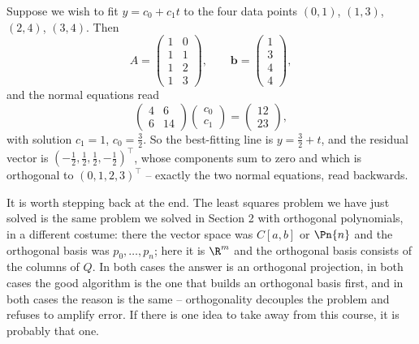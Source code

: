 \begin{example}
  Suppose we wish to fit $y = c_0 + c_1t$ to the four data points $(0,1)$, $(1,3)$, $(2,4)$, $(3,4)$. Then
  $$
  A = \begin{pmatrix}1&0\\1&1\\1&2\\1&3\end{pmatrix}, \qquad \mathbf b = \begin{pmatrix}1\\3\\4\\4\end{pmatrix},
  $$
  and the normal equations read
  $$
  \begin{pmatrix}4&6\\6&14\end{pmatrix}\begin{pmatrix}c_0\\c_1\end{pmatrix} = \begin{pmatrix}12\\23\end{pmatrix},
  $$
  with solution $c_1 = 1$, $c_0 = \tfrac32$. So the best-fitting line is $y = \tfrac32 + t$, and the residual vector is $\left(-\tfrac12, \tfrac12, \tfrac12, -\tfrac12\right)^\top$, whose components sum to zero and which is orthogonal to $(0,1,2,3)^\top$ -- exactly the two normal equations, read backwards.
\end{example}

\begin{remark}
  It is worth stepping back at the end. The least squares problem we have just solved is the same problem we solved in Section 2 with orthogonal polynomials, in a different costume: there the vector space was $C[a,b]$ or $\Pn{n}$ and the orthogonal basis was $p_0, \dots, p_n$; here it is $\R^m$ and the orthogonal basis consists of the columns of $Q$. In both cases the answer is an orthogonal projection, in both cases the good algorithm is the one that builds an orthogonal basis first, and in both cases the reason is the same -- orthogonality decouples the problem and refuses to amplify error. If there is one idea to take away from this course, it is probably that one.
\end{remark}

